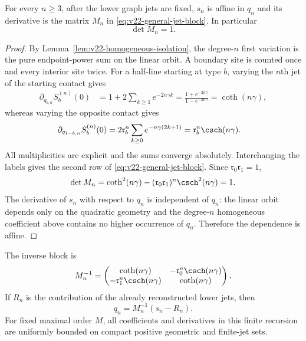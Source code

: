\begin{proposition}
\label{prop:v22-last-jet-block}
For every $n\ge3$, after the lower graph jets are fixed, $s_n$ is affine in
$q_n$ and its derivative is the matrix $M_n$ in
\eqref{eq:v22-general-jet-block}.  In particular
\begin{equation}\label{eq:v22-last-jet-det}
                              \det M_n=1.
\end{equation}
\end{proposition}

\begin{proof}
By Lemma~\ref{lem:v22-homogeneous-isolation}, the degree-$n$ first variation
is the pure endpoint-power sum on the linear orbit.  A boundary site is
counted once and every interior site twice.  For a half-line starting at type
$b$, varying the $n$th jet of the starting contact gives
\begin{align}
 \partial_{q_{b,n}}S_b^{(n)}(0)
 &=1+2\sum_{k\ge1}e^{-2n\gamma k}
   =\frac{1+e^{-2n\gamma}}{1-e^{-2n\gamma}}
   =\coth(n\gamma),                         \label{eq:v22-own-sum}
\end{align}
whereas varying the opposite contact gives
\begin{align}
 \partial_{q_{1-b,n}}S_b^{(n)}(0)
 &=2\mathfrak r_b^n\sum_{k\ge0}e^{-n\gamma(2k+1)}
   =\mathfrak r_b^n\csch(n\gamma).          \label{eq:v22-cross-sum}
\end{align}
All multiplicities are explicit and the sums converge absolutely.
Interchanging the labels gives the second row of
\eqref{eq:v22-general-jet-block}.  Since
$\mathfrak r_0\mathfrak r_1=1$,
\[
 \det M_n
 =\coth^2(n\gamma)
  -(\mathfrak r_0\mathfrak r_1)^n\csch^2(n\gamma)
 =1.
\]
The derivative of $s_n$ with respect to $q_n$ is independent of $q_n$:
the linear orbit depends only on the quadratic geometry and the degree-$n$
homogeneous coefficient above contains no higher occurrence of $q_n$.
Therefore the dependence is affine.
\end{proof}

The inverse block is
\begin{equation}\label{eq:v22-general-recursion}
 M_n^{-1}=
 \begin{pmatrix}
 \coth(n\gamma)&-\mathfrak r_0^n\csch(n\gamma)\\
 -\mathfrak r_1^n\csch(n\gamma)&\coth(n\gamma)
 \end{pmatrix}.
\end{equation}
If $R_n$ is the contribution of the already reconstructed lower jets, then
\begin{equation}\label{eq:v22-recursion}
                         q_n=M_n^{-1}(s_n-R_n).
\end{equation}
For fixed maximal order $M$, all coefficients and derivatives in this finite
recursion are uniformly bounded on compact positive geometric and finite-jet
sets.

